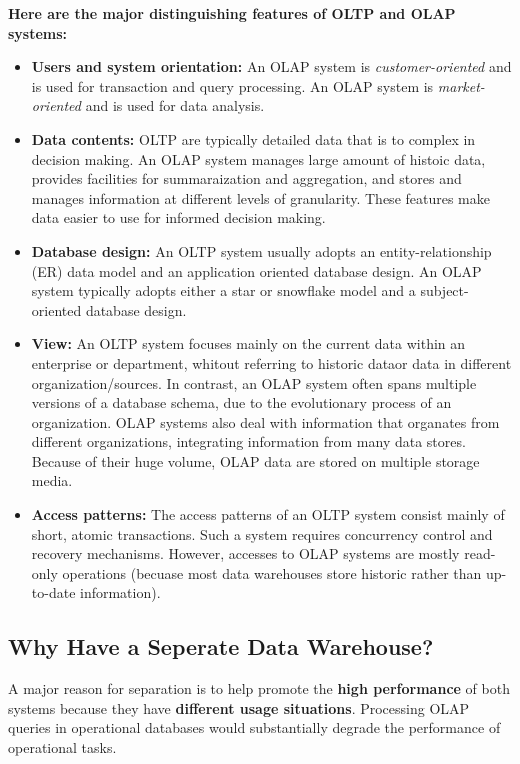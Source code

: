 		{\bf Here are the major distinguishing features of OLTP and OLAP systems:}
		\begin{itemize}
			\item {\bf Users and system orientation:} An OLAP system is {\it customer-oriented}
			and is used for transaction and query processing. An OLAP system is {\it market-oriented}
			and is used for data analysis.
			\item {\bf Data contents:} OLTP are typically detailed data that is to complex in 
			decision making. An OLAP system manages large amount of histoic data, provides
			facilities for summaraization and aggregation, and stores and manages information 
			at different levels of granularity. These features make data easier to use for informed
			decision making. 
			\item {\bf Database design:} An OLTP system usually adopts an entity-relationship (ER)
			data model and an application oriented database design. An OLAP system typically adopts 
			either a star or snowflake model and a subject-oriented database design. 
			\item {\bf View:} An OLTP system focuses mainly on the current data within an enterprise
			or department, whitout referring to historic dataor data in different organization/sources.
			In contrast, an OLAP system often spans multiple versions of a database schema, due to 
			the evolutionary process of an organization. OLAP systems also deal with information 
			that organates from different organizations, integrating information from many data stores.
			Because of their huge volume, OLAP data are stored on multiple storage media. 
			\item {\bf Access patterns:} The access patterns of an OLTP system consist mainly of short, 
			atomic transactions. Such a system requires concurrency control and recovery mechanisms. 
			However, accesses to OLAP systems are mostly read-only  operations
			(becuase most data warehouses store historic rather than up-to-date information).
		\end{itemize}
	\clearpage
	\subsection{Why Have a Seperate Data Warehouse?}
		
		A major reason for separation is to help promote the {\bf high performance} of both systems
		because they have {\bf different usage situations}. Processing OLAP queries in operational
		databases would substantially degrade the performance of operational tasks. 

